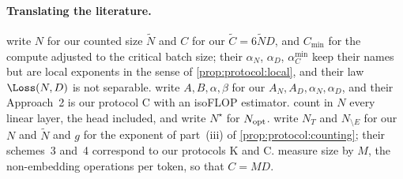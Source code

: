 \begin{refsection}
\paragraph{Translating the literature.} \Textcite{KaplanEtAl2020} write $N$ for our counted size $\tilde N$ and $C$ for our $\tilde C=6\tilde ND$, and $C_{\min}$ for the compute adjusted to the critical batch size; their $\alpha_N$, $\alpha_D$, $\alpha_C^{\min}$ keep their names but are local exponents in the sense of \cref{prop:protocol:local}, and their law $\Loss(N,D)$ is not separable. \Textcite{HoffmannEtAl2022} write $A,B,\alpha,\beta$ for our $A_N,A_D,\alpha_N,\alpha_D$, and their Approach~2 is our protocol C with an isoFLOP estimator. \Textcite{PorianEtAl2024} count in $N$ every linear layer, the head included, and write $N^\star$ for $N_{\mathrm{opt}}$. \Textcite{PearceSong2024} write $N_T$ and $N_{\setminus E}$ for our $N$ and $\tilde N$ and $g$ for the exponent of part~(iii) of \cref{prop:protocol:counting}; their schemes~3 and~4 correspond to our protocols K and C. \Textcite{BiEtAl2024} measure size by $M$, the non-embedding operations per token, so that $C=MD$.

\printchapterbib
\end{refsection}

